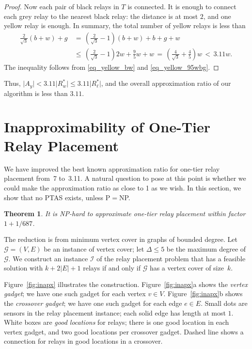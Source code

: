 \documentclass[11pt,a4paper]{article}
\newcommand{\s}[1]{{\lvert #1 \rvert}}
\newcommand{\myG}{\mathcal{G}}
\newcommand{\myI}{\mathcal{I}}
\newcommand{\optrel}{R^{*}}
\newtheorem{theorem}{Theorem}
\theoremstyle{definition}
\theoremstyle{remark}
\begin{document}
\begin{proof}
    Now each pair of black relays in $T$ is connected. It is enough to connect each grey relay to the nearest black relay: the distance is at most $2$, and one yellow relay is enough. In summary, the total number of yellow relays is less than
    \[
        \begin{split}
        \frac{2}{\sqrt{3}} (b+w) + g
        &\,=\, \left(\frac{2}{\sqrt{3}} - 1\right) (b+w) + b+g + w \\
        &\,\le\, \left(\frac{2}{\sqrt{3}} - 1\right) 2 w + \frac{9}{5} w + w
        \,=\, \left(\frac{4}{\sqrt{3}} + \frac45 \right)w
        \,<\, 3.11 w .
        \end{split}
    \]
    The inequality follows from \eqref{eq_yellow_bw} and \eqref{eq_yellow_95wbg}.
\end{proof}

Thus, $\s{A_y} < 3.11 \s{\optrel_w} \le 3.11 \s{\optrel_\ell}$, and the overall approximation ratio of our algorithm is less than $3.11$.



\section{Inapproximability of One-Tier Relay Placement}\label{sec_inapx1tier}

We have improved the best known approximation ratio for one-tier relay placement from~7 to~3.11. A natural question to pose at this point is whether we could make the approximation ratio as close to 1 as we wish. In this section, we show that no PTAS exists, unless P${}={}$NP.
\begin{theorem}\label{thm:inapx}
    It is NP-hard to approximate one-tier relay placement within factor\/ $1 + 1/687$.
\end{theorem}

The reduction is from minimum vertex cover in graphs of bounded degree. Let $\myG = (V,E)$ be an instance of vertex cover; let $\Delta \le 5$ be the maximum degree of $\myG$. We construct an instance $\myI$ of the relay placement problem that has a feasible solution with\/ $k + 2\s{E} + 1$ relays if and only if $\myG$ has a vertex cover of size~$k$.

Figure~\ref{fig:inapx} illustrates the construction. Figure~\ref{fig:inapx}a shows the \emph{vertex gadget}; we have one such gadget for each vertex $v \in V$. Figure~\ref{fig:inapx}b shows the \emph{crossover gadget}; we have one such gadget for each edge $e \in E$. Small dots are sensors in the relay placement instance; each solid edge has length at most $1$. White boxes are \emph{good locations} for relays; there is one good location in each vertex gadget, and two good locations per crossover gadget. Dashed line shows a connection for relays in good locations in a crossover.
\end{document}
